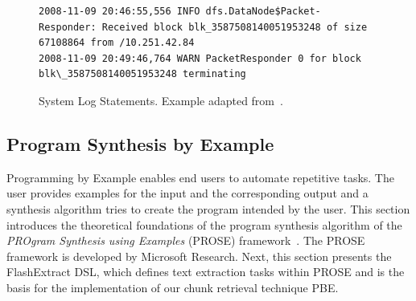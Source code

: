 \begin{figure}[!t]
  \centering
  \begin{lstlisting}[breaklines=true]
2008-11-09 20:46:55,556 INFO dfs.DataNode$Packet- Responder: Received block blk_3587508140051953248 of size 67108864 from /10.251.42.84
2008-11-09 20:49:46,764 WARN PacketResponder 0 for block blk\_3587508140051953248 terminating
  \end{lstlisting}  
  \caption{System Log Statements. Example adapted from~\cite{he2017towards}.}
  \label{lst:system-log}
\end{figure}

\subsection{Program Synthesis by Example}
\label{sec:rw-prose}

Programming by Example enables end users to automate repetitive tasks.
The user provides examples for the input and the corresponding output and a
synthesis algorithm tries to create the program intended by the user.
This section introduces the theoretical foundations of the program synthesis
algorithm of the \emph{PROgram Synthesis using Examples} (PROSE) framework~\cite{prose2019webpage}.
The PROSE framework is developed by Microsoft Research.
Next, this section presents the FlashExtract DSL, which defines text extraction
tasks within PROSE and is the basis for the implementation of our chunk retrieval technique PBE\@.

